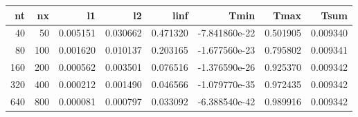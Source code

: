 \begin{tabular}{rrrrrrrr}
\toprule
  nt &   nx &        l1 &        l2 &      linf &          Tmin &      Tmax &      Tsum \\
\midrule
  40 &   50 &  0.005151 &  0.030662 &  0.471320 & -7.841860e-22 &  0.501905 &  0.009340 \\
  80 &  100 &  0.001620 &  0.010137 &  0.203165 & -1.677560e-23 &  0.795802 &  0.009341 \\
 160 &  200 &  0.000562 &  0.003501 &  0.076516 & -1.376590e-26 &  0.925370 &  0.009342 \\
 320 &  400 &  0.000212 &  0.001490 &  0.046566 & -1.079770e-35 &  0.972435 &  0.009342 \\
 640 &  800 &  0.000081 &  0.000797 &  0.033092 & -6.388540e-42 &  0.989916 &  0.009342 \\
\bottomrule
\end{tabular}
